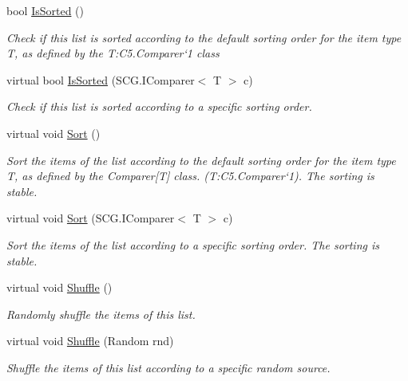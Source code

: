 \begin{DoxyCompactItemize}
bool \hyperlink{class_c5_1_1_hashed_linked_list_ab34c0de0335ccd7d9d16efd159d4411b}{Is\+Sorted} ()
\begin{DoxyCompactList}\small\item\em Check if this list is sorted according to the default sorting order for the item type T, as defined by the T\+:\+C5.\+Comparer`1 class \end{DoxyCompactList}\item 
virtual bool \hyperlink{class_c5_1_1_hashed_linked_list_a7d539fd8712f39feca8e3b1c561e8850}{Is\+Sorted} (S\+C\+G.\+I\+Comparer$<$ T $>$ c)
\begin{DoxyCompactList}\small\item\em Check if this list is sorted according to a specific sorting order. \end{DoxyCompactList}\item 
virtual void \hyperlink{class_c5_1_1_hashed_linked_list_aec6a08f56ea7e0824118849c15f17b62}{Sort} ()
\begin{DoxyCompactList}\small\item\em Sort the items of the list according to the default sorting order for the item type T, as defined by the Comparer\mbox{[}T\mbox{]} class. (T\+:\+C5.\+Comparer`1). The sorting is stable. \end{DoxyCompactList}\item 
virtual void \hyperlink{class_c5_1_1_hashed_linked_list_a017110699d25ae50b4ea7687c71e64a4}{Sort} (S\+C\+G.\+I\+Comparer$<$ T $>$ c)
\begin{DoxyCompactList}\small\item\em Sort the items of the list according to a specific sorting order. The sorting is stable. \end{DoxyCompactList}\item 
virtual void \hyperlink{class_c5_1_1_hashed_linked_list_a7d705d1d949be5d4b6a154d2c9f28200}{Shuffle} ()
\begin{DoxyCompactList}\small\item\em Randomly shuffle the items of this list. \end{DoxyCompactList}\item 
virtual void \hyperlink{class_c5_1_1_hashed_linked_list_acb52fe8c7bce2ed047c03b3718eab410}{Shuffle} (Random rnd)
\begin{DoxyCompactList}\small\item\em Shuffle the items of this list according to a specific random source. \end{DoxyCompactList}\item 

\end{DoxyCompactItemize}
